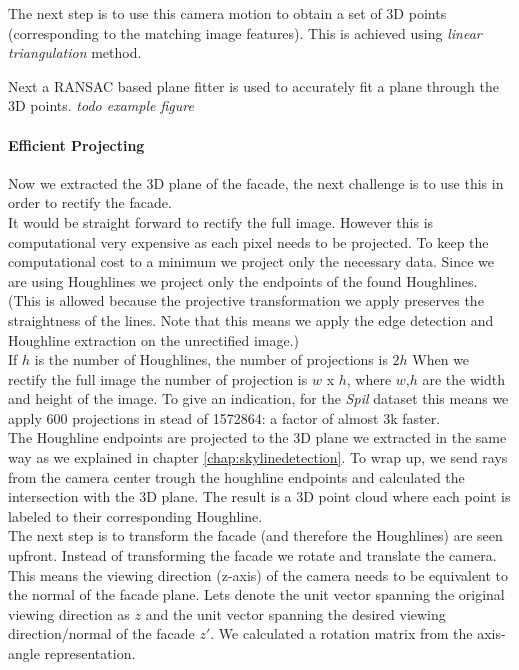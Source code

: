 The next step is to use this camera motion to obtain a set of 3D points
(corresponding to the matching image features).  This is achieved using \emph{linear triangulation}
method. 

Next a RANSAC based plane fitter is used to accurately fit a plane through
the 3D points. 
\emph{todo example figure}

\paragraph{Efficient Projecting} 
Now we extracted the 3D plane of the facade, the next challenge is to use this
in order to rectify the facade.\\

It would be straight forward to rectify the full image. However this is
computational very expensive as each pixel needs to be projected. To keep the
computational cost to a minimum we project only the necessary data. Since we
are using Houghlines we project only the endpoints of the found Houghlines. 
(This is allowed because the projective transformation we apply preserves the
straightness of the lines. Note that this means we apply the edge detection and
Houghline extraction on the unrectified image.)\\

If $h$ is the number of Houghlines, the number of projections is $2h$
When we rectify the full image the number of projection is $w$ x $h$, where $w$,$h$ are the width and height of
the image. To give an indication, for the \emph{Spil} dataset 
this means we apply 600 projections in stead of 1572864: a factor of almost 3k faster.\\

The Houghline endpoints are projected to the 3D plane we extracted in the same
way as we explained in chapter \ref{chap:skylinedetection}. To wrap up, we send
rays from the camera center trough the houghline endpoints and calculated the
intersection with the 3D plane.  The result is a 3D point cloud where each
point is labeled to their corresponding Houghline.\\

The next step is to transform the facade (and therefore the Houghlines) are
seen upfront. Instead of transforming the facade we rotate and translate the camera. 
This means the viewing direction (z-axis) of the camera needs
to be equivalent to the normal of the facade plane. Lets denote the
unit vector spanning the original viewing direction as $z$ and the
unit vector spanning the desired viewing direction/normal of the facade $z'$.
We calculated a rotation matrix from the axis-angle representation.\\

